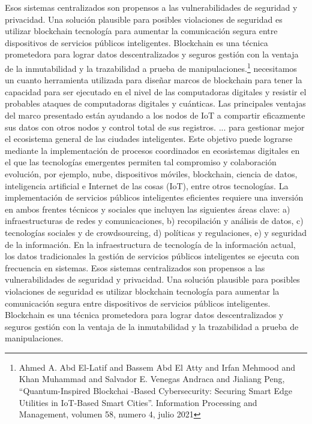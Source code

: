 \documentclass[12pt]{report} %
\begin{document}
Esos sistemas centralizados son propensos a las vulnerabilidades de seguridad y privacidad.  Una solución plausible para posibles violaciones de seguridad es utilizar blockchain  tecnología para aumentar la comunicación segura entre dispositivos de servicios públicos inteligentes.  Blockchain es una técnica prometedora para lograr datos descentralizados y seguros  gestión con la ventaja de la inmutabilidad y la trazabilidad a prueba de manipulaciones.\footnote{Ahmed A. Abd El-Latif and Bassem Abd El Atty and Irfan Mehmood and Khan Muhammad and Salvador E. Venegas Andraca and Jialiang Peng, “Quantum-Inspired Blockchai -Based Cybersecurity: Securing Smart Edge Utilities in IoT-Based Smart Cities”. Information Processing and Management, volumen 58, numero 4, julio 2021} necesitamos un cuanto  herramienta utilizada para diseñar marcos de blockchain para tener la capacidad  para ser ejecutado en el nivel de las computadoras digitales y resistir el  probables ataques de computadoras digitales y cuánticas.
    Las principales ventajas del  marco presentado están ayudando a los nodos de IoT a compartir eficazmente sus  datos con otros nodos y control total de sus registros.
  ... para gestionar mejor el ecosistema general de las ciudades inteligentes. Este objetivo puede  lograrse mediante la implementación de procesos coordinados en ecosistemas digitales  en el que las tecnologías emergentes permiten tal compromiso y colaboración
  evolución, por ejemplo, nube, dispositivos móviles, blockchain, ciencia de datos,
  inteligencia artificial e Internet de las cosas (IoT), entre otros  tecnologías.
  La implementación de servicios públicos inteligentes eficientes requiere una inversión en ambos  frentes técnicos y sociales que incluyen las siguientes áreas clave:
  a) infraestructuras de redes y comunicaciones,
  b) recopilación y análisis de datos,
  c) tecnologías sociales y de crowdsourcing,
  d) políticas y regulaciones,
  e) y seguridad de la información.
  En la infraestructura de tecnología de la información actual, los datos tradicionales
  la gestión de servicios públicos inteligentes se ejecuta con frecuencia en
  sistemas.  Esos sistemas centralizados son propensos a las vulnerabilidades de seguridad y privacidad.  Una solución plausible para posibles violaciones de seguridad es utilizar blockchain  tecnología para aumentar la comunicación segura entre dispositivos de servicios públicos inteligentes.
  Blockchain es una técnica prometedora para lograr datos descentralizados y seguros
  gestión con la ventaja de la inmutabilidad y la trazabilidad a prueba de manipulaciones. 
\end{document}
